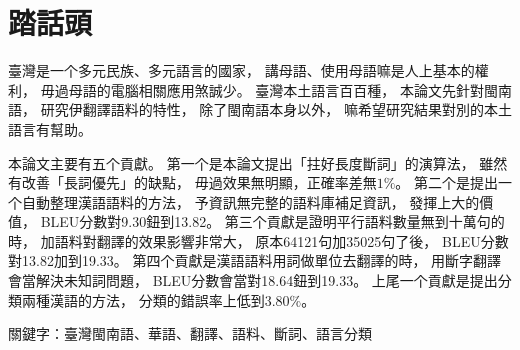 \chapter{踏話頭}
臺灣是一个多元民族、多元語言的國家，
講母語、使用母語嘛是人上基本的權利，
毋過母語的電腦相關應用煞誠少。
臺灣本土語言百百種，
本論文先針對閩南語，
研究伊翻譯語料的特性，
除了閩南語本身以外，
嘛希望研究結果對別的本土語言有幫助。

本論文主要有五个貢獻。
第一个是本論文提出「拄好長度斷詞」的演算法，
雖然有改善「長詞優先」的缺點，
毋過效果無明顯，正確率差無$1\%$。
第二个是提出一个自動整理漢語語料的方法，
予資訊無完整的語料庫補足資訊，
發揮上大的價值，
BLEU分數對9.30鈕到13.82。
第三个貢獻是證明平行語料數量無到十萬句的時，
加語料對翻譯的效果影響非常大，
原本64121句加35025句了後，
BLEU分數對13.82加到19.33。
第四个貢獻是漢語語料用詞做單位去翻譯的時，
用斷字翻譯會當解決未知詞問題，
BLEU分數會當對18.64鈕到19.33。
上尾一个貢獻是提出分類兩種漢語的方法，
分類的錯誤率上低到$3.80\%$。

關鍵字：臺灣閩南語、華語、翻譯、語料、斷詞、語言分類
